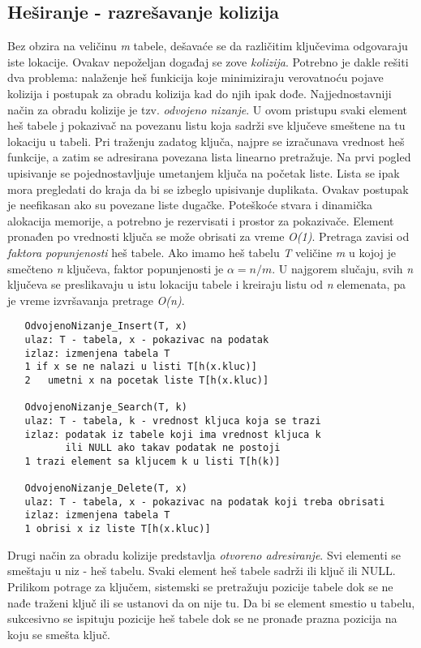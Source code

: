 \documentclass{article}
\begin{document}
\subsection{Heširanje - razrešavanje kolizija}
Bez obzira na veličinu \textit{m} tabele, dešavaće se da različitim ključevima odgovaraju iste lokacije. Ovakav nepoželjan događaj se zove \textit{kolizija}. Potrebno je dakle rešiti dva problema: nalaženje heš funkicija koje minimiziraju verovatnoću pojave kolizija i postupak za obradu kolizija kad do njih ipak dođe.
\newline
Najjednostavniji način za obradu kolizije je tzv. \textit{odvojeno
nizanje}. U ovom pristupu svaki element heš tabele j pokazivač na
povezanu listu koja sadrži sve ključeve smeštene na tu lokaciju u
tabeli. Pri traženju zadatog ključa, najpre se izračunava vrednost heš funkcije, a zatim se adresirana povezana lista linearno pretražuje. Na prvi pogled upisivanje se pojednostavljuje umetanjem ključa na početak liste. Lista se ipak mora pregledati do kraja da bi se izbeglo upisivanje duplikata. Ovakav postupak je neefikasan ako su povezane liste dugačke. Poteškoće stvara i dinamička alokacija memorije, a potrebno je rezervisati i prostor za pokazivače. Element pronađen po vrednosti ključa se može obrisati za vreme \textit{O(1)}.
Pretraga zavisi od \textit{faktora popunjenosti} heš tabele.
Ako imamo heš tabelu \textit{T} veličine \textit{m} u kojoj je smečteno \textit{n} ključeva, faktor popunjenosti je $\alpha = n/m$. U najgorem slučaju, svih \textit{n} ključeva se preslikavaju u istu lokaciju tabele i kreiraju listu od \textit{n} elemenata, pa je vreme izvršavanja pretrage \textit{O(n)}.
\begin{lstlisting}
   OdvojenoNizanje_Insert(T, x)
   ulaz: T - tabela, x - pokazivac na podatak
   izlaz: izmenjena tabela T
   1 if x se ne nalazi u listi T[h(x.kluc)]
   2   umetni x na pocetak liste T[h(x.kluc)]
   
   OdvojenoNizanje_Search(T, k)
   ulaz: T - tabela, k - vrednost kljuca koja se trazi
   izlaz: podatak iz tabele koji ima vrednost kljuca k
          ili NULL ako takav podatak ne postoji
   1 trazi element sa kljucem k u listi T[h(k)]
   
   OdvojenoNizanje_Delete(T, x)
   ulaz: T - tabela, x - pokazivac na podatak koji treba obrisati
   izlaz: izmenjena tabela T
   1 obrisi x iz liste T[h(x.kluc)]
\end{lstlisting}
Drugi način za obradu kolizije predstavlja \textit{otvoreno adresiranje}. Svi elementi se smeštaju u niz - heš tabelu. Svaki element heš tabele sadrži ili ključ ili NULL. Prilikom potrage za ključem, sistemski se pretražuju pozicije tabele dok se ne nađe traženi ključ ili se ustanovi da on nije tu. Da bi se element smestio u tabelu, sukcesivno se ispituju pozicije heš tabele dok se ne pronađe prazna pozicija na koju se smešta ključ. 
\end{document}
